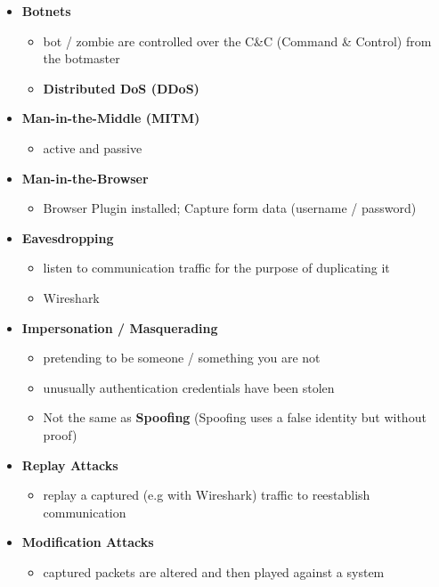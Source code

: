 \documentclass[11pt,twoside,landscape]{article}
\begin{document}
\begin{multicols}{4}
\begin{itemize}
\begin{itemize}
\item \textbf{Botnets}
\begin{itemize}
\item bot / zombie are controlled over the C\&C (Command \& Control) from the botmaster
\item \textbf{Distributed DoS (DDoS)}
\end{itemize}

\item \textbf{Man-in-the-Middle (MITM)}
\begin{itemize}
\item active and passive
\end{itemize}

\item \textbf{Man-in-the-Browser}
\begin{itemize}
\item Browser Plugin installed; Capture form data (username / password)
\end{itemize}

\item \textbf{Eavesdropping}
\begin{itemize}
\item listen to communication traffic for the purpose of duplicating it
\item Wireshark
\end{itemize}

\item \textbf{Impersonation / Masquerading}
\begin{itemize}
\item pretending to be someone / something you are not
\item unusually authentication credentials have been stolen
\item Not the same as \textbf{Spoofing} (Spoofing uses a false identity but without proof)
\end{itemize}

\item \textbf{Replay Attacks}
\begin{itemize}
\item replay a captured (e.g with Wireshark) traffic to reestablish communication
\end{itemize}

\item \textbf{Modification Attacks}
\begin{itemize}
\item captured packets are altered and then played against a system
\end{itemize}
\end{itemize}
\end{itemize}



\end{multicols}
\end{document}
